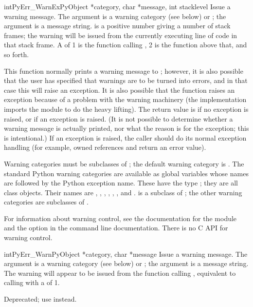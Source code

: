 \begin{cfuncdesc}{int}{PyErr_WarnEx}{PyObject *category, char *message, int stacklevel}
  Issue a warning message.  The  argument is a warning
  category (see below) or \NULL; the  argument is a
  message string.   is a positive number giving a
  number of stack frames; the warning will be issued from the 
  currently executing line of code in that stack frame.  A 
  of 1 is the function calling , 2 is 
  the function above that, and so forth.

  This function normally prints a warning message to ;
  however, it is also possible that the user has specified that
  warnings are to be turned into errors, and in that case this will
  raise an exception.  It is also possible that the function raises an
  exception because of a problem with the warning machinery (the
  implementation imports the  module to do the heavy
  lifting).  The return value is  if no exception is raised,
  or  if an exception is raised.  (It is not possible to
  determine whether a warning message is actually printed, nor what
  the reason is for the exception; this is intentional.)  If an
  exception is raised, the caller should do its normal exception
  handling (for example,  owned references and
  return an error value).

  Warning categories must be subclasses of ; the
  default warning category is .  The standard
  Python warning categories are available as global variables whose
  names are  followed by the Python exception name.
  These have the type ; they are all class objects.
  Their names are , ,
  , ,
  , , and
  .   is a subclass of
  ; the other warning categories are subclasses
  of .

  For information about warning control, see the documentation for the
   module and the  option in the
  command line documentation.  There is no C API for warning control.
\end{cfuncdesc}

\begin{cfuncdesc}{int}{PyErr_Warn}{PyObject *category, char *message}
  Issue a warning message.  The  argument is a warning
  category (see below) or \NULL; the  argument is a
  message string.  The warning will appear to be issued from the function
  calling , equivalent to calling
   with a  of 1.
  
  Deprecated; use  instead.
\end{cfuncdesc}

